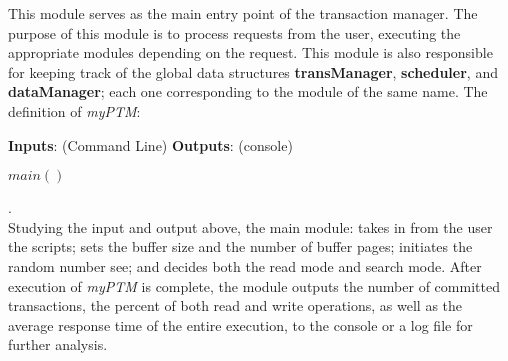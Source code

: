 This module serves as the main entry point of the transaction manager. The purpose of this module is to process requests from the user, executing the appropriate modules depending on the request. This module is also responsible for keeping track of the global data structures \textbf{transManager}, \textbf{scheduler}, and \textbf{dataManager}; each one corresponding to the module of the same name. The definition of \textit{myPTM}:
\\
\begin{algorithmic}[1]

    \STATE \textbf{Inputs}: (Command Line)
    \STATE {}
    \STATE {}
     \STATE {}
     \STATE {}
     \STATE {}
      \STATE {}
      \STATE \textbf{Outputs}: (console)
       \STATE {}
        \STATE {}
         \STATE {}
    	 \STATE {}
	
	\STATE \textbf{ $main()$ }   \\
    
\end{algorithmic}  .\\

Studying the input and output above, the main module: takes in from the user the scripts; sets the buffer size and the number of buffer pages; initiates the random number see; and decides both the read mode and search mode. After execution of \textit{myPTM} is complete, the module outputs the number of committed transactions, the percent of both read and write operations, as well as the average response time of the entire execution, to the console or a log file for further analysis.